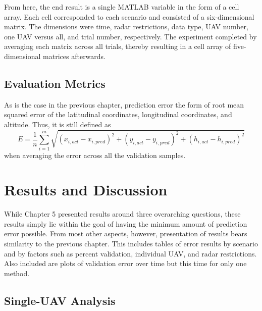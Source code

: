 \documentclass[12pt]{uthesis-v12}  %
\begin{document}
From here, the end result is a single MATLAB variable in the form of a cell array. Each cell corresponded to each scenario and consisted of a six-dimensional matrix. The dimensions were time, radar restrictions, data type, UAV number, one UAV versus all, and trial number, respectively. The experiment completed by averaging each matrix across all trials, thereby resulting in a cell array of five-dimensional matrices afterwards.

\subsection{Evaluation Metrics}

As is the case in the previous chapter, prediction error the form of root mean squared error of the latitudinal coordinates, longitudinal coordinates, and altitude. Thus, it is still defined as
\begin{equation}
E = \frac{1}{n}\sum_{i=1}^m \sqrt{(x_{i,act}-x_{i,pred})^2+(y_{i,act}-y_{i,pred})^2+(h_{i,act}-h_{i,pred})^2}
\label{error-final}
\end{equation}
when averaging the error across all the validation samples.

\section{Results and Discussion}

While Chapter 5 presented results around three overarching questions, these results simply lie within the goal of having the minimum amount of prediction error possible. From most other aspects, however, presentation of results bears similarity to the previous chapter. This includes tables of error results by scenario and by factors such as percent validation, individual UAV, and radar restrictions. Also included are plots of validation error over time but this time for only one method.

\subsection{Single-UAV Analysis}
\label{one-uav}
\end{document}
